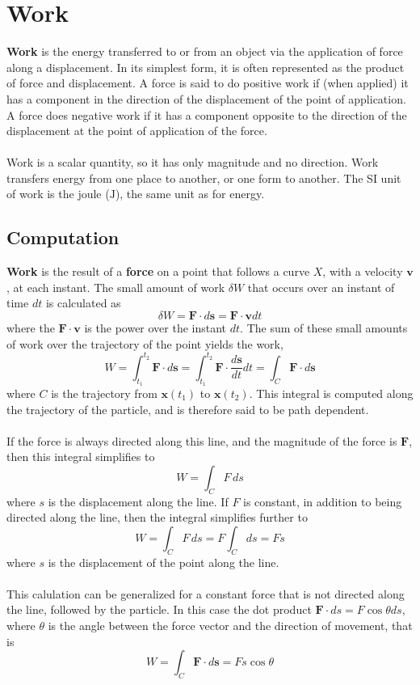 \section{Work}
\textbf{Work} is the energy transferred to or from an object via the application of force along a displacement. In its simplest form, it is often represented as the product of force and displacement. A force is said to do positive work if (when applied) it has a component in the direction of the displacement of the point of application. A force does negative work if it has a component opposite to the direction of the displacement at the point of application of the force.
\\\\
Work is a scalar quantity, so it has only magnitude and no direction. Work transfers energy from one place to another, or one form to another. The SI unit of work is the joule ($\textrm{J}$), the same unit as for energy.
\subsection{Computation}
\textbf{Work} is the result of a \textbf{force} on a point that follows a curve $X$, with a velocity $\mathbf{v}$, at each instant. The small amount of work $\delta W$ that occurs over an instant of time $dt$ is calculated as
\[
\delta W  = \mathbf{F}\cdot d\mathbf{s} = \mathbf{F}\cdot\mathbf{v}dt
\]
where the $\mathbf{F}\cdot\mathbf{v}$ is the power over the instant $dt$. The sum of these small amounts of work over the trajectory of the point yields the work,
\[
W = \int_{t_1}^{t_2} \mathbf{F}\cdot d\mathbf{s} = \int_{t_1}^{t_2} \mathbf{F}\cdot \frac{d\mathbf{s}}{dt} dt = \int_C \mathbf{F}\cdot d\mathbf{s}
\]
where $C$ is the trajectory from $\mathbf{x}(t_1)$ to $\mathbf{x}(t_2)$. This integral is computed along the trajectory of the particle, and is therefore said to be path dependent.
\\\\
If the force is always directed along this line, and the magnitude of the force is $\mathbf{F}$, then this integral simplifies to
\[
W = \int_C F\, ds
\]
where $s$ is the displacement along the line. If $F$ is constant, in addition to being directed along the line, then the integral simplifies further to
\[
W = \int_C F\, ds = F\int_C ds = Fs
\]
where $s$ is the displacement of the point along the line.
\\\\
This calulation can be generalized for a constant force that is not directed along the line, followed by the particle. In this case the dot product $\mathbf{F}\cdot ds = F\cos\theta ds$, where $\theta$ is the angle between the force vector and the direction of movement, that is
\[
W = \int_C \mathbf{F}\cdot d\mathbf{s} = Fs\cos\theta
\]

